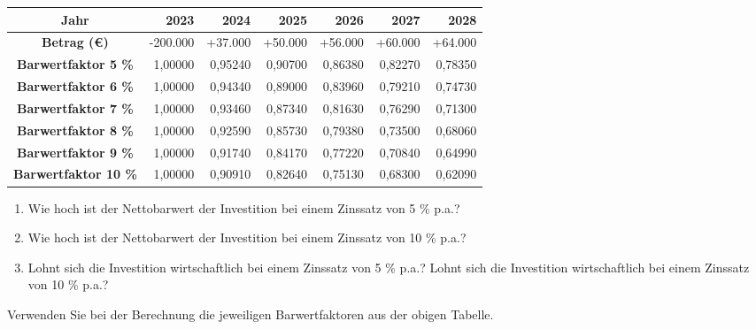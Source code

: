 \begin{table}[H]
\centering
\begin{tabular}{|c|r|r|r|r|r|r|}
\hline
\textbf{Jahr} & \textbf{2023} & \textbf{2024} & \textbf{2025} & \textbf{2026} & \textbf{2027} & \textbf{2028} \\
\hline
\textbf{Betrag (€)} & -200.000 & +37.000 & +50.000 & +56.000 & +60.000 & +64.000 \\
\hline
\textbf{Barwertfaktor 5 \%} & 1,00000 & 0,95240 & 0,90700 & 0,86380 & 0,82270 & 0,78350 \\
\hline
\textbf{Barwertfaktor 6 \%} & 1,00000 & 0,94340 & 0,89000 & 0,83960 & 0,79210 & 0,74730 \\
\hline
\textbf{Barwertfaktor 7 \%} & 1,00000 & 0,93460 & 0,87340 & 0,81630 & 0,76290 & 0,71300 \\
\hline
\textbf{Barwertfaktor 8 \%} & 1,00000 & 0,92590 & 0,85730 & 0,79380 & 0,73500 & 0,68060 \\
\hline
\textbf{Barwertfaktor 9 \%} & 1,00000 & 0,91740 & 0,84170 & 0,77220 & 0,70840 & 0,64990 \\
\hline
\textbf{Barwertfaktor 10 \%} & 1,00000 & 0,90910 & 0,82640 & 0,75130 & 0,68300 & 0,62090 \\
\hline
\end{tabular}
\end{table}

\begin{enumerate}[label=(\alph*)]
    \item Wie hoch ist der Nettobarwert der Investition bei einem Zinssatz von 5 \% p.a.?
    \item Wie hoch ist der Nettobarwert der Investition bei einem Zinssatz von 10 \% p.a.?
    \item Lohnt sich die Investition wirtschaftlich bei einem Zinssatz von 5 \% p.a.? Lohnt sich die Investition wirtschaftlich bei einem Zinssatz von 10 \% p.a.?
\end{enumerate}

Verwenden Sie bei der Berechnung die jeweiligen Barwertfaktoren aus der obigen Tabelle.

